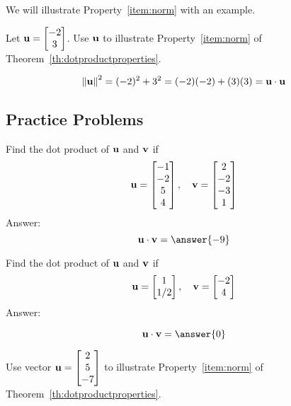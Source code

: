 \documentclass{ximera}
\renewcommand{\vec}[1]{{\bf #1}}
\newcommand{\dotp}{\cdot}
\newcommand\norm[1]{\left\lVert#1\right\rVert}
\begin{document}

We will illustrate Property~\ref{item:norm} with an example.
\begin{example}\label{ex:exprop6}
  Let $\vec{u}=\begin{bmatrix}-2\\3\end{bmatrix}$.  Use $\vec{u}$ to illustrate Property~\ref{item:norm} of Theorem~\ref{th:dotproductproperties}.
  \begin{explanation}
  
  $$\norm{\vec{u}}^2=(-2)^2+3^2=(-2)(-2)+(3)(3)=\vec{u}\dotp\vec{u}$$
  \end{explanation}
\end{example}

\subsection*{Practice Problems}

\begin{problem}
Find the dot product of $\vec{u}$ and $\vec{v}$ if
  $$\vec{u}=\begin{bmatrix}-1\\-2\\5\\4\end{bmatrix},\quad \vec{v}=\begin{bmatrix}2\\-2\\-3\\1\end{bmatrix}$$
  Answer:
  $$\vec{u} \dotp \vec{v} = \answer{-9}$$
\end{problem}

\begin{problem}
Find the dot product of $\vec{u}$ and $\vec{v}$ if 
  $$\vec{u}=\begin{bmatrix}1\\1/2\end{bmatrix},\quad \vec{v}=\begin{bmatrix}-2\\4\end{bmatrix}$$
  Answer:
  
  $$\vec{u} \dotp \vec{v} = \answer{0}$$
\end{problem}

\begin{problem}
  Use vector $\vec{u}=\begin{bmatrix}2\\5\\-7\end{bmatrix}$ to
  illustrate Property~\ref{item:norm} of Theorem~\ref{th:dotproductproperties}.
\end{problem}
\end{document}
